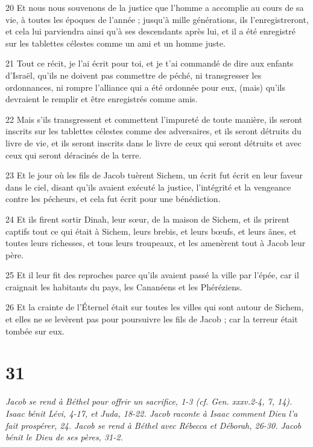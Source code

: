 \par 20 Et nous nous souvenons de la justice que l'homme a accomplie au cours de sa vie, à toutes les époques de l'année ; jusqu'à mille générations, ils l'enregistreront, et cela lui parviendra ainsi qu'à ses descendants après lui, et il a été enregistré sur les tablettes célestes comme un ami et un homme juste.
\par 21 Tout ce récit, je l'ai écrit pour toi, et je t'ai commandé de dire aux enfants d'Israël, qu'ils ne doivent pas commettre de péché, ni transgresser les ordonnances, ni rompre l'alliance qui a été ordonnée pour eux, (mais) qu'ils devraient le remplir et être enregistrés comme amis.
\par 22 Mais s'ils transgressent et commettent l'impureté de toute manière, ils seront inscrits sur les tablettes célestes comme des adversaires, et ils seront détruits du livre de vie, et ils seront inscrits dans le livre de ceux qui seront détruits et avec ceux qui seront déracinés de la terre.
\par 23 Et le jour où les fils de Jacob tuèrent Sichem, un écrit fut écrit en leur faveur dans le ciel, disant qu'ils avaient exécuté la justice, l'intégrité et la vengeance contre les pécheurs, et cela fut écrit pour une bénédiction.
\par 24 Et ils firent sortir Dinah, leur sœur, de la maison de Sichem, et ils prirent captifs tout ce qui était à Sichem, leurs brebis, et leurs bœufs, et leurs ânes, et toutes leurs richesses, et tous leurs troupeaux, et les amenèrent tout à Jacob leur père.
\par 25 Et il leur fit des reproches parce qu'ils avaient passé la ville par l'épée, car il craignait les habitants du pays, les Cananéens et les Phéréziens.
\par 26 Et la crainte de l'Éternel était sur toutes les villes qui sont autour de Sichem, et elles ne se levèrent pas pour poursuivre les fils de Jacob ; car la terreur était tombée sur eux.

\chapter{31}

\par \textit{Jacob se rend à Béthel pour offrir un sacrifice, 1-3 (cf. Gen. xxxv.2-4, 7, 14). Isaac bénit Lévi, 4-17, et Juda, 18-22. Jacob raconte à Isaac comment Dieu l'a fait prospérer, 24. Jacob se rend à Béthel avec Rébecca et Déborah, 26-30. Jacob bénit le Dieu de ses pères, 31-2.}

